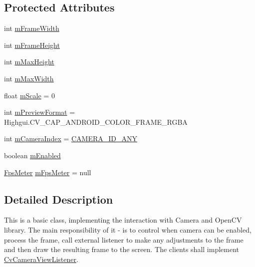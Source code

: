 \subsection*{Protected Attributes}
\begin{DoxyCompactItemize}
\item 
int \mbox{\hyperlink{classorg_1_1opencv_1_1android_1_1_camera_bridge_view_base_a14c4b2eeacbf8301bdd990303a09fd22}{m\+Frame\+Width}}
\item 
int \mbox{\hyperlink{classorg_1_1opencv_1_1android_1_1_camera_bridge_view_base_abaf8e02f741ee04b48f760b58d3841b1}{m\+Frame\+Height}}
\item 
int \mbox{\hyperlink{classorg_1_1opencv_1_1android_1_1_camera_bridge_view_base_aaefae7c94d327fedafcce5bbf1112d42}{m\+Max\+Height}}
\item 
int \mbox{\hyperlink{classorg_1_1opencv_1_1android_1_1_camera_bridge_view_base_a45ff36c0647a87ee1bbdb5369773990c}{m\+Max\+Width}}
\item 
float \mbox{\hyperlink{classorg_1_1opencv_1_1android_1_1_camera_bridge_view_base_a3cfd662850639e17abd414dcf8044749}{m\+Scale}} = 0
\item 
int \mbox{\hyperlink{classorg_1_1opencv_1_1android_1_1_camera_bridge_view_base_a88cd5fc733ebf09c80bd64c349c69d95}{m\+Preview\+Format}} = Highgui.\+C\+V\+\_\+\+C\+A\+P\+\_\+\+A\+N\+D\+R\+O\+I\+D\+\_\+\+C\+O\+L\+O\+R\+\_\+\+F\+R\+A\+M\+E\+\_\+\+R\+G\+BA
\item 
int \mbox{\hyperlink{classorg_1_1opencv_1_1android_1_1_camera_bridge_view_base_af81a5737885f0f0e47fcaf93cf97d11a}{m\+Camera\+Index}} = \mbox{\hyperlink{classorg_1_1opencv_1_1android_1_1_camera_bridge_view_base_adb9fe0de7cb47fb89e3450eb4e4ef1b5}{C\+A\+M\+E\+R\+A\+\_\+\+I\+D\+\_\+\+A\+NY}}
\item 
boolean \mbox{\hyperlink{classorg_1_1opencv_1_1android_1_1_camera_bridge_view_base_a69e0f6e010a540727ef110b09df59bba}{m\+Enabled}}
\item 
\mbox{\hyperlink{classorg_1_1opencv_1_1android_1_1_fps_meter}{Fps\+Meter}} \mbox{\hyperlink{classorg_1_1opencv_1_1android_1_1_camera_bridge_view_base_abdf75805374f9cda83974f71dc7c0aff}{m\+Fps\+Meter}} = null
\end{DoxyCompactItemize}


\subsection{Detailed Description}
This is a basic class, implementing the interaction with Camera and Open\+CV library. The main responsibility of it -\/ is to control when camera can be enabled, process the frame, call external listener to make any adjustments to the frame and then draw the resulting frame to the screen. The clients shall implement \mbox{\hyperlink{interfaceorg_1_1opencv_1_1android_1_1_camera_bridge_view_base_1_1_cv_camera_view_listener}{Cv\+Camera\+View\+Listener}}. 

